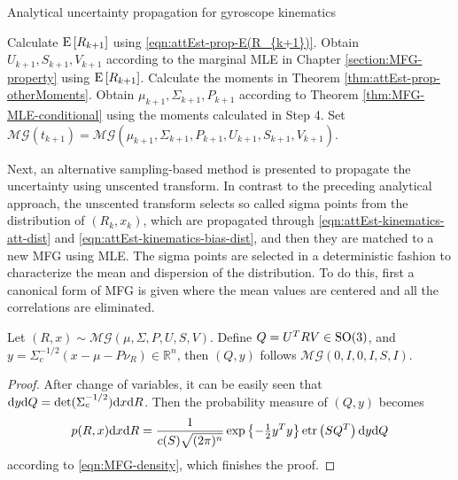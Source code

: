 \begin{table}
	\caption{Analytical uncertainty propagation for gyroscope kinematics}
	\label{tab:attEst-prop-analytical}
	\begin{algorithmic}[1]
		\algrule[0.8pt]
		\algrule
		\State Calculate $\mathrm{E}\left[ R_{k+1} \right]$ using \eqref{eqn:attEst-prop-E(R_{k+1})}.
		\State Obtain $U_{k+1},S_{k+1},V_{k+1}$ according to the marginal MLE in Chapter \ref{section:MFG-property} using $\mathrm{E}\left[ R_{k+1} \right]$.
		\State Calculate the moments in Theorem \ref{thm:attEst-prop-otherMoments}.
		\State Obtain $\mu_{k+1},\Sigma_{k+1},P_{k+1}$ according to Theorem \ref{thm:MFG-MLE-conditional} using the moments calculated in Step 4.
		\State Set $\mathcal{MG}(t_{k+1}) = \mathcal{MG}(\mu_{k+1},\Sigma_{k+1},P_{k+1},U_{k+1},S_{k+1},V_{k+1})$.
		\EndProcedure
		\algrule[0.8pt]
	\end{algorithmic}
\end{table}

Next, an alternative sampling-based method is presented to propagate the uncertainty using unscented transform.
In contrast to the preceding analytical approach, the unscented transform selects so called sigma points from the distribution of $(R_k,x_k)$, which are propagated through \eqref{eqn:attEst-kinematics-att-dist} and \eqref{eqn:attEst-kinematics-bias-dist}, and then they are matched to a new MFG using MLE.
The sigma points are selected in a deterministic fashion to characterize the mean and dispersion of the distribution.
To do this, first a canonical form of MFG is given where the mean values are centered and all the correlations are eliminated.
\begin{lemma}
	Let $(R,x)\sim \mathcal{MG}(\mu,\Sigma,P,U,S,V)$.
	Define $Q = U^TRV\in\mathrm{SO}(3)$, and $y = \Sigma_c^{-1/2}(x-\mu-P\nu_R)\in\mathbb{R}^n$, then $(Q,y)$ follows $\mathcal{MG}(0,I,0,I,S,I)$.
\end{lemma}
\begin{proof}
	After change of variables, it can be easily seen that $\mathrm{d} y \mathrm{d} Q = \det(\Sigma_c^{-1/2}) \mathrm{d} x \mathrm{d} R$.
	Then the probability measure of $(Q,y)$ becomes
	\begin{align*}
		p(R,x) \mathrm{d} x \mathrm{d} R =  \frac{1}{c(S)\sqrt{(2\pi)^n}} \exp\left\{ -\tfrac{1}{2}y^Ty \right\} \mathrm{etr}\left( SQ^T \right) \mathrm{d} y \mathrm{d} Q
	\end{align*}
	according to \eqref{eqn:MFG-density}, which finishes the proof.
\end{proof}

